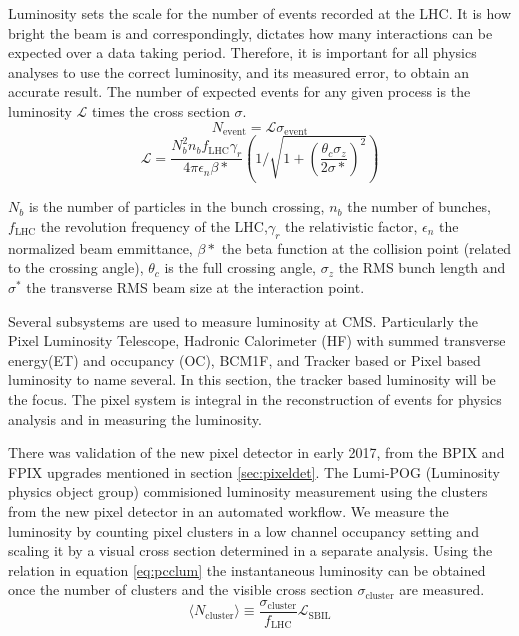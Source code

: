 Luminosity sets the scale for the number of events recorded at the LHC. It is how bright the beam is and correspondingly, dictates how many interactions can be expected over a data taking period. Therefore, it is important for all physics analyses to use the correct luminosity, and its measured error, to obtain an accurate result. The number of expected events for any given process is the luminosity $\mathcal{L}$ times the cross section $\sigma$.  
\begin{equation}
N_{\text{event}} = \mathcal{L} \sigma_{\text{event}}
\end{equation}
\begin{equation}
\mathcal{L} = \frac{N_b^2 n_b f_\text{LHC} \gamma_r}{4\pi\epsilon_n \beta*}\left( 1 / \sqrt{1+ (\frac{\theta_c \sigma_z}{2\sigma*})^2} \right)
\end{equation}

$N_b$ is the number of particles in the bunch crossing, $n_b$ the number of bunches, $f_{\text{LHC}}$ the revolution frequency of the LHC,$\gamma_r$ the relativistic factor, $\epsilon_n$ the normalized beam emmittance, $\beta*$ the beta function at the collision point (related to the crossing angle), $\theta_c$ is the full crossing angle, $\sigma_z$ the RMS bunch length and $\sigma^*$ the transverse RMS beam size at the interaction point.

Several subsystems are used to measure luminosity at CMS. Particularly the Pixel Luminosity Telescope, Hadronic Calorimeter (HF) with summed transverse energy(ET) and occupancy (OC), BCM1F, and Tracker based or Pixel based luminosity to name several. 
In this section, the tracker based luminosity will be the focus. The pixel system is integral in the reconstruction of events for physics analysis and in measuring the luminosity.

There was validation of the new pixel detector in early 2017, from the BPIX and FPIX upgrades mentioned in section \ref{sec:pixeldet}. The Lumi-POG (Luminosity physics object group) commisioned luminosity measurement using the clusters from the new pixel detector in an automated workflow. 
We measure the luminosity by counting pixel clusters in a low channel occupancy setting and scaling it by a visual cross section determined in a separate analysis. Using the relation in equation \ref{eq:pcclum} the instantaneous luminosity can be obtained once the number of clusters and the visible cross section $\sigma_\text{cluster}$ are measured. 
\begin{equation}
\label{eq:pcclum}
\langle N_{\text{cluster}}\rangle\equiv\frac{\sigma_{\text{cluster}}}{f_{\text{LHC}}}\mathcal{L}_{\text{SBIL}}
\end{equation}

